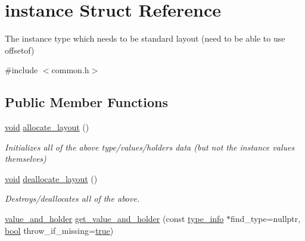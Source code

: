 \hypertarget{structinstance}{}\section{instance Struct Reference}
\label{structinstance}


The \textquotesingle{}instance\textquotesingle{} type which needs to be standard layout (need to be able to use \textquotesingle{}offsetof\textquotesingle{})  




{\ttfamily \#include $<$common.\+h$>$}

\subsection*{Public Member Functions}
\begin{DoxyCompactItemize}
\item 
\mbox{\hyperlink{_s_d_l__opengles2__gl2ext_8h_ae5d8fa23ad07c48bb609509eae494c95}{void}} \mbox{\hyperlink{structinstance_addb02b48487bafc757c28d40d1d6a995}{allocate\+\_\+layout}} ()
\begin{DoxyCompactList}\small\item\em Initializes all of the above type/values/holders data (but not the instance values themselves) \end{DoxyCompactList}\item 
\mbox{\hyperlink{_s_d_l__opengles2__gl2ext_8h_ae5d8fa23ad07c48bb609509eae494c95}{void}} \mbox{\hyperlink{structinstance_a0e6db8a0edd9f4d440a4b31fb1f59d19}{deallocate\+\_\+layout}} ()
\begin{DoxyCompactList}\small\item\em Destroys/deallocates all of the above. \end{DoxyCompactList}\item 
\mbox{\hyperlink{structvalue__and__holder}{value\+\_\+and\+\_\+holder}} \mbox{\hyperlink{structinstance_a33fb0acd9a08898baf6dfefc54477821}{get\+\_\+value\+\_\+and\+\_\+holder}} (const \mbox{\hyperlink{structtype__info}{type\+\_\+info}} $\ast$find\+\_\+type=nullptr, \mbox{\hyperlink{asdl_8h_af6a258d8f3ee5206d682d799316314b1}{bool}} throw\+\_\+if\+\_\+missing=\mbox{\hyperlink{asdl_8h_af6a258d8f3ee5206d682d799316314b1a08f175a5505a10b9ed657defeb050e4b}{true}})
\end{DoxyCompactItemize}
